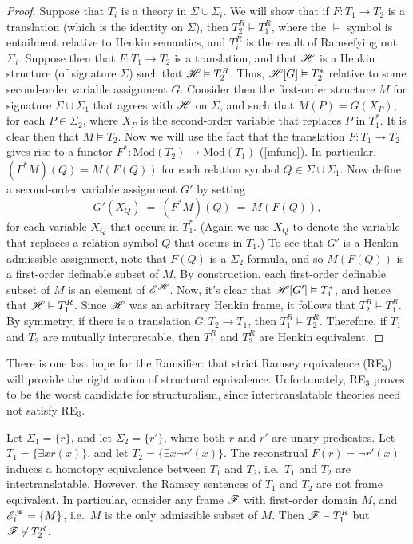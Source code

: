 \begin{proof} Suppose that $T_i$ is a theory in
  $\Sigma\cup \Sigma _i$.  We will show that if $F:T_1\to T_2$ is a
  translation (which is the identity on $\Sigma$), then
  $T_2^R\vDash T_1^R$, where the $\vDash$ symbol is entailment
  relative to Henkin semantics, and $T_i^R$ is the result of
  Ramsefying out $\Sigma _i$.  Suppose then that $F:T_1\to T_2$ is a
  translation, and that $\mathscr H$ is a Henkin structure (of signature
  $\Sigma$) such that $\mathscr H\vDash T_2^R$.  Thus, $\mathscr H [G]\vDash T_2^*$
  relative to some second-order variable assignment $G$.  Consider
  then the first-order structure $M$ for signature
  $\Sigma\cup \Sigma _1$ that agrees with $\mathscr H$ on $\Sigma$, and such
  that $M(P)=G(X_P)$, for each $P\in \Sigma _2$, where $X_P$ is the
  second-order variable that replaces $P$ in $T_1^*$.  It is clear
  then that $M\vDash T_2$.  Now we will use the fact that the
  translation $F:T_1\to T_2$ gives rise to a functor
  $F^*:\mathrm{Mod}(T_2)\to \mathrm{Mod}(T_1)$ (\ref{mfunc}).  In
  particular, $(F^*M)(Q)=M(F(Q))$ for each relation symbol
  $Q\in\Sigma\cup\Sigma _1$.  Now define a second-order variable
  assignment $G'$ by setting
    \[ G'(X_Q) \: = \: (F^*M)(Q) \: = \: M(F(Q)) ,\] for each variable
    $X_Q$ that occurs in $T_1^*$.  (Again we use $X_Q$ to denote the
    variable that replaces a relation symbol $Q$ that occurs in
    $T_1$.)  To see that $G'$ is a Henkin-admissible assignment, note
    that $F(Q)$ is a $\Sigma _2$-formula, and so $M(F(Q))$ is a
    first-order definable subset of $M$.  By construction, each
    first-order definable subset of $M$ is an element of $\mathscr E ^{\mathscr H}$.
    Now, it's clear that $\mathscr H [G']\vDash T_1^*$, and hence that
    $\mathscr H\vDash T_1^R$.  Since $\mathscr H$ was an arbitrary Henkin frame, it
    follows that $T_2^R\vDash T_1^R$.  By symmetry, if there is a
    translation $G:T_2\to T_1$, then $T_1^R\vDash T_2^R$.  Therefore,
    if $T_1$ and $T_2$ are mutually interpretable, then $T_1^R$ and
    $T_2^R$ are Henkin equivalent. \end{proof}

  There is one last hope for the Ramsifier: that strict Ramsey
  equivalence (RE$_3$) will provide the right notion of structural
  equivalence.  Unfortunately, RE$_3$ proves to be the worst candidate
  for structuralism, since intertranslatable theories need not satisfy
  RE$_3$.
  
  \begin{example} Let $\Sigma _1 = \{ r\}$, and let
    $\Sigma _2=\{ r'\}$, where both $r$ and $r'$ are unary predicates.
    Let $T_1=\{ \exists xr(x) \}$, and let
    $T_2=\{ \exists x \neg r'(x)\}$.  The reconstrual
    $F(r)=\neg r'(x)$ induces a homotopy equivalence between $T_1$ and
    $T_2$, i.e.\ $T_1$ and $T_2$ are intertranslatable.  However, the
    Ramsey sentences of $T_1$ and $T_2$ are not frame equivalent.  In
    particular, consider any frame $\mathscr F$ with first-order domain $M$,
    and $\mathscr E ^{\mathscr F}_1=\{ M\}$, i.e.\ $M$ is the only admissible subset
    of $M$.  Then $\mathscr F \vDash T_1^R$ but $\mathscr F \not\vDash
    T_2^R$.  \end{example}
  
